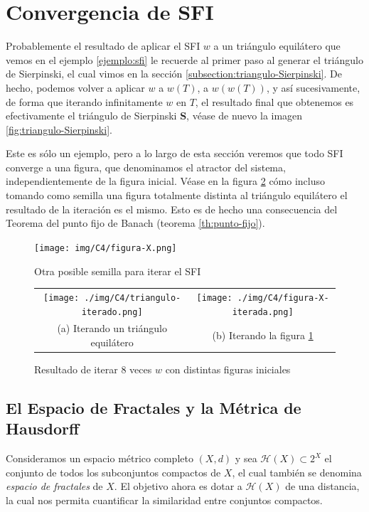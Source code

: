\section{Convergencia de SFI}
\label{section:convergencia-sfi}

Probablemente el resultado de aplicar el SFI $w$ a un triángulo equilátero que vemos en el ejemplo \ref{ejemplo:sfi} le recuerde al primer paso al generar el triángulo de Sierpinski, el cual vimos en la sección \ref{subsection:triangulo-Sierpinski}. De hecho, podemos volver a aplicar $w$ a $w(T)$, a $w(w(T))$, y así sucesivamente, de forma que iterando infinitamente $w$ en $T$, el resultado final que obtenemos es efectivamente el triángulo de Sierpinski \textbf{S}, véase de nuevo la imagen \ref{fig:triangulo-Sierpinski}.

Este es sólo un ejemplo, pero a lo largo de esta sección veremos que todo SFI converge a una figura, que denominamos el atractor del sistema, independientemente de la figura inicial. Véase en la figura \ref{fig:semillas-sfi} cómo incluso tomando como semilla una figura totalmente distinta al triángulo equilátero el resultado de la iteración es el mismo. Esto es de hecho una consecuencia del Teorema del punto fijo de Banach (teorema \ref{th:punto-fijo}).

\begin{figure} [ht]
    \centering
    \texttt{[image: img/C4/figura-X.png]}
    \caption{Otra posible semilla para iterar el SFI}
        \label{fig:semilla-X}
\end{figure}

\begin{figure}[ht]
    \centering
    \begin{tabular}{cc}
      \texttt{[image: ./img/C4/triangulo-iterado.png]} &   \texttt{[image: ./img/C4/figura-X-iterada.png]} \\
    (a) Iterando un triángulo equilátero & (b) Iterando la figura \ref{fig:semilla-X} 
    \end{tabular}
    \caption{Resultado de iterar 8 veces $w$ con distintas figuras iniciales}
    \label{fig:semillas-sfi}
\end{figure}

\subsection{El Espacio de Fractales y la Métrica de Hausdorff}

Consideramos un espacio métrico completo $(X,d)$ y sea $\mathcal{H}(X)\subset 2^X$ el conjunto de todos los subconjuntos compactos de $X$, el cual también se denomina \textit{espacio de fractales} de $X$. El objetivo ahora es dotar a $\mathcal{H}(X)$ de una distancia, la cual nos permita cuantificar la similaridad entre conjuntos compactos. 


